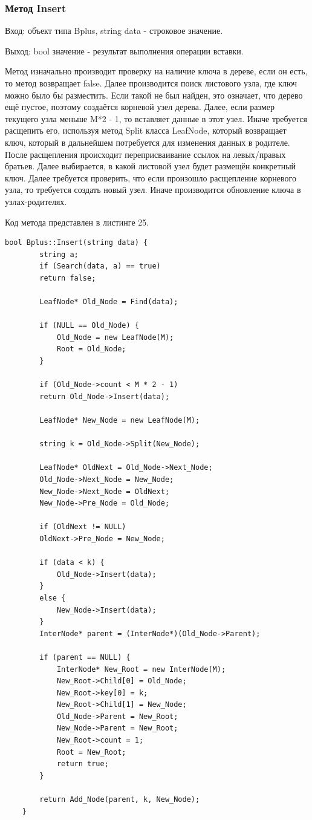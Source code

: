 \documentclass[11pt,a4paper,final]{article} %
\begin{document}
\subsubsection{Метод Insert}
Вход: объект типа Bplus, string data - строковое значение. \par
Выход: bool значение - результат выполнения операции вставки. \par
Метод изначально производит проверку на наличие ключа в дереве, если он есть, то метод возвращает false. Далее производится поиск листового узла, где ключ можно было бы разместить. Если такой не был найден, это означает, что дерево ещё пустое, поэтому создаётся корневой узел дерева. Далее, если размер текущего узла меньше M*2 - 1, то вставляет данные в этот узел. Иначе требуется расщепить его, используя метод Split класса LeafNode, который возвращает ключ, который в дальнейшем потребуется для изменения данных в родителе. После расщепления происходит переприсваивание ссылок на левых/правых братьев. Далее выбирается, в какой листовой узел будет размещён конкретный ключ. Далее требуется проверить, что если произошло расщепление корневого узла, то требуется создать новый узел. Иначе производится обновление ключа в узлах-родителях. \par
Код метода представлен в листинге 25.
\begin{lstlisting}[label=Insert, caption = Метод Insert]
	bool Bplus::Insert(string data) {
		string a;
		if (Search(data, a) == true)
		return false;
		
		LeafNode* Old_Node = Find(data);
		
		if (NULL == Old_Node) {
			Old_Node = new LeafNode(M);
			Root = Old_Node;
		}
		
		if (Old_Node->count < M * 2 - 1)
		return Old_Node->Insert(data);
		
		LeafNode* New_Node = new LeafNode(M);
		
		string k = Old_Node->Split(New_Node);
		
		LeafNode* OldNext = Old_Node->Next_Node;
		Old_Node->Next_Node = New_Node;
		New_Node->Next_Node = OldNext;
		New_Node->Pre_Node = Old_Node;
		
		if (OldNext != NULL)
		OldNext->Pre_Node = New_Node;
		
		if (data < k) {
			Old_Node->Insert(data);
		}
		else {
			New_Node->Insert(data);
		}
		InterNode* parent = (InterNode*)(Old_Node->Parent);
		
		if (parent == NULL) {
			InterNode* New_Root = new InterNode(M);
			New_Root->Child[0] = Old_Node;
			New_Root->key[0] = k;
			New_Root->Child[1] = New_Node;
			Old_Node->Parent = New_Root;
			New_Node->Parent = New_Root;
			New_Root->count = 1;
			Root = New_Root;
			return true;
		}
		
		return Add_Node(parent, k, New_Node);
	}
\end{lstlisting}
\end{document}
